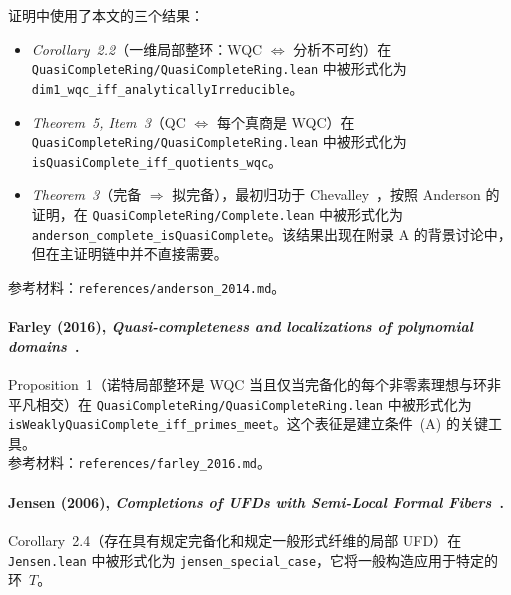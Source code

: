 证明中使用了本文的三个结果：
\begin{itemize}
\item \emph{Corollary~2.2}（一维局部整环：WQC $\Leftrightarrow$ 分析不可约）在 \texttt{QuasiCompleteRing/QuasiCompleteRing.lean} 中被形式化为 \texttt{dim1\_wqc\_iff\_analyticallyIrreducible}。
\item \emph{Theorem~5, Item~3}（QC $\Leftrightarrow$ 每个真商是 WQC）在 \texttt{QuasiCompleteRing/QuasiCompleteRing.lean} 中被形式化为 \texttt{isQuasiComplete\_iff\_quotients\_wqc}。
\item \emph{Theorem~3}（完备 $\Rightarrow$ 拟完备），最初归功于 Chevalley~\cite{chevalley1943theory}，按照 Anderson 的证明，在 \texttt{QuasiCompleteRing/Complete.lean} 中被形式化为 \texttt{anderson\_complete\_isQuasiComplete}。该结果出现在附录 A 的背景讨论中，但在主证明链中并不直接需要。
\end{itemize}
参考材料：\texttt{references/anderson\_2014.md}。

\paragraph{Farley (2016), \emph{Quasi-completeness and localizations of polynomial domains}~\cite{farley2016quasi}.}

Proposition~1（诺特局部整环是 WQC 当且仅当完备化的每个非零素理想与环非平凡相交）在 \texttt{QuasiCompleteRing/QuasiCompleteRing.lean} 中被形式化为 \texttt{isWeaklyQuasiComplete\_iff\_primes\_meet}。这个表征是建立条件~(A) 的关键工具。\\
参考材料：\texttt{references/farley\_2016.md}。

\paragraph{Jensen (2006), \emph{Completions of UFDs with Semi-Local Formal Fibers}~\cite{jensen2006completions}.}

Corollary~2.4（存在具有规定完备化和规定一般形式纤维的局部 UFD）在 \texttt{Jensen.lean} 中被形式化为 \texttt{jensen\_special\_case}，它将一般构造应用于特定的环~$T$。

